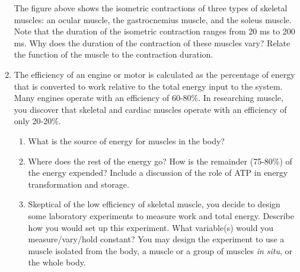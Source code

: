 \documentclass{article}
\begin{document}
\begin{enumerate}
	The figure above shows the isometric contractions of three types of skeletal muscles: an ocular muscle, the gastrocnemius muscle, and the soleus muscle. Note that the duration of the isometric contraction ranges from 20 ms to 200 ms. Why does the duration of the contraction of these muscles vary? Relate the function of the muscle to the contraction duration.
	\item The efficiency of an engine or motor is calculated as the percentage of energy that is converted to work relative to the total energy input to the system. Many engines operate with an efficiency of 60-80\%. In researching muscle, you discover that skeletal and cardiac muscles operate with an efficiency of only 20-20\%.
		\begin{enumerate}
			\item What is the source of energy for muscles in the body?
			\item Where does the rest of the energy go? How is the remainder (75-80\%) of the energy expended? Include a discussion of the role of ATP in energy transformation and storage.
			\item Skeptical of the low efficiency of skeletal muscle, you decide to design some laboratory experiments to measure work and total energy. Describe how you would set up this experiment. What variable(s) would you measure/vary/hold constant? You may design the experiment to use a muscle isolated from the body, a muscle or a group of muscles \textit{in situ}, or the whole body.
		\end{enumerate}
\end{enumerate}
\end{document}
